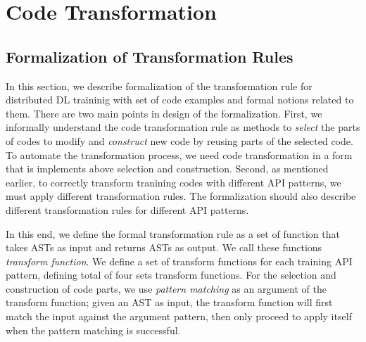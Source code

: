 \pagebreak
\section{Code Transformation}\label{sec:trans}

\subsection{Formalization of Transformation Rules}

In this section, we describe formalization of the transformation rule
for distributed DL traininig with set of code examples and formal notions
related to them.
There are two main points in design of the formalization.
First, we informally understand the code transformation rule as methods to
\textit{select} the parts of codes to modify and \textit{construct} new code by 
reusing parts of the selected code.
To automate the transformation process, we need code transformation in a form 
that is implements above selection and construction.
Second, as mentioned earlier, to correctly transform tranining codes with different
API patterns, we must apply different transformation rules.
The formalization should also describe different transformation rules
for different API patterns.

In this end, we define the formal transformation rule as a set of
function that takes ASTs as input and returns ASTs as output.
We call these functions \textit{transform function}.
We define a set of transform functions for each training API pattern,
defining total of four sets transform functions.
For the selection and construction of code parts,
we use \textit{pattern matching} as an argument of the transform function;
given an AST as input, the transform function will first match the
input against the argument pattern, then only proceed to apply itself
when the pattern matching is successful.

